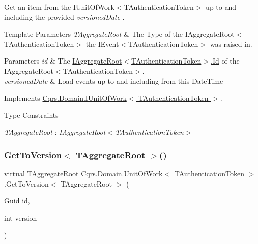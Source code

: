 Get an item from the I\+Unit\+Of\+Work$<$\+T\+Authentication\+Token$>$ up to and including the provided {\itshape versioned\+Date} . 


\begin{DoxyTemplParams}{Template Parameters}
{\em T\+Aggregate\+Root} & The Type of the I\+Aggregate\+Root$<$\+T\+Authentication\+Token$>$ the I\+Event$<$\+T\+Authentication\+Token$>$ was raised in.\\
\hline
\end{DoxyTemplParams}

\begin{DoxyParams}{Parameters}
{\em id} & The \hyperlink{interfaceCqrs_1_1Domain_1_1IAggregateRoot_a04aa3198f1371afa345a58e8fcb713d7_a04aa3198f1371afa345a58e8fcb713d7}{I\+Aggregate\+Root$<$\+T\+Authentication\+Token$>$.\+Id} of the I\+Aggregate\+Root$<$\+T\+Authentication\+Token$>$.\\
\hline
{\em versioned\+Date} & Load events up-\/to and including from this Date\+Time\\
\hline
\end{DoxyParams}


Implements \hyperlink{interfaceCqrs_1_1Domain_1_1IUnitOfWork_a9878de7ddb925b1ef2193b8734d79a3a_a9878de7ddb925b1ef2193b8734d79a3a}{Cqrs.\+Domain.\+I\+Unit\+Of\+Work$<$ T\+Authentication\+Token $>$}.

\begin{Desc}
\item[Type Constraints]\begin{description}
\item[{\em T\+Aggregate\+Root} : {\em I\+Aggregate\+Root$<$T\+Authentication\+Token$>$}]\end{description}
\end{Desc}
\mbox{\label{classCqrs_1_1Domain_1_1UnitOfWork_aa0e705ac7f323abfb552bcbce2a7d692_aa0e705ac7f323abfb552bcbce2a7d692}} 
\subsubsection{\texorpdfstring{Get\+To\+Version$<$ T\+Aggregate\+Root $>$()}{GetToVersion< TAggregateRoot >()}}
{\footnotesize\ttfamily virtual T\+Aggregate\+Root \hyperlink{classCqrs_1_1Domain_1_1UnitOfWork}{Cqrs.\+Domain.\+Unit\+Of\+Work}$<$ T\+Authentication\+Token $>$.Get\+To\+Version$<$ T\+Aggregate\+Root $>$ (\begin{DoxyParamCaption}\item[{Guid}]{id,  }\item[{int}]{version }\end{DoxyParamCaption})\hspace{0.3cm}{\ttfamily [virtual]}}



